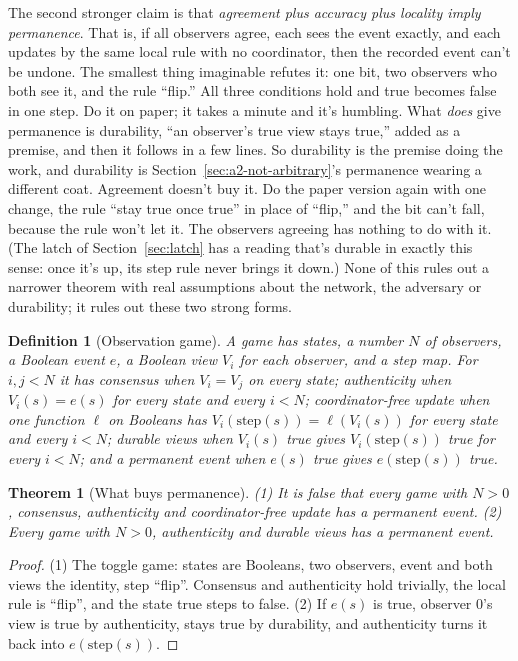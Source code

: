 \documentclass[11pt,twoside]{article}
\theoremstyle{thielethm}
\newtheorem{theorem}{Theorem}[section]
\theoremstyle{thieledef}
\newtheorem{definition}{Definition}[section]
\theoremstyle{thieledef}
\theoremstyle{thieledef}
\theoremstyle{thielethm}
\theoremstyle{thieleobs}
\theoremstyle{thielethm}
\begin{document}
The second stronger claim is that \emph{agreement plus accuracy plus locality imply permanence}. That is,
if all observers agree, each sees the event exactly, and each updates by the same local rule
with no coordinator, then the recorded event can't be undone. The smallest thing
imaginable refutes it: one bit, two observers who both see it, and the rule ``flip.'' All three conditions
hold and true becomes false in one step. Do
it on paper; it takes a minute and it's humbling. What \emph{does} give permanence is durability,
``an observer's true view stays true,'' added as a premise, and then it follows in a few lines. So durability is the premise doing the work, and
durability is Section~\ref{sec:a2-not-arbitrary}'s permanence wearing a different coat. Agreement doesn't buy it. Do the
paper version again with one change, the rule ``stay true once true'' in place of ``flip,'' and
the bit can't fall, because the rule won't let it. The observers agreeing has nothing to do with it. (The
latch of Section~\ref{sec:latch} has a reading that's durable in exactly this sense: once it's up, its step
rule never brings it down.) None of this rules out a narrower theorem with real assumptions about the network,
the adversary or durability; it rules out these two strong forms.

\begin{definition}[Observation game]\label{def:u14-game}
A \emph{game} has states, a number $N$ of observers, a Boolean event $e$, a Boolean view $V_i$ for
each observer, and a step map. For $i, j < N$ it has \emph{consensus} when $V_i = V_j$ on every
state; \emph{authenticity} when $V_i(s) = e(s)$ for every state and every $i < N$;
\emph{coordinator-free update} when one function $\ell$ on Booleans has
$V_i(\mathrm{step}(s)) = \ell(V_i(s))$ for every state and every $i < N$; \emph{durable views} when
$V_i(s)$ true gives $V_i(\mathrm{step}(s))$ true for every $i < N$; and a \emph{permanent event}
when $e(s)$ true gives $e(\mathrm{step}(s))$ true.
\end{definition}

\begin{theorem}[What buys permanence]\label{thm:u14-toggle}
(1) It is false that every game with $N > 0$, consensus, authenticity and coordinator-free
update has a permanent event. (2) Every game with $N > 0$, authenticity and durable views has
a permanent event.
\end{theorem}

\begin{proof}
(1) The toggle game: states are Booleans, two observers, event and both views the identity,
step ``flip''. Consensus and authenticity hold trivially, the local rule is ``flip'', and the
state true steps to false. (2) If $e(s)$ is true, observer 0's view is true by authenticity,
stays true by durability, and authenticity turns it back into $e(\mathrm{step}(s))$.
\end{proof}
\end{document}

